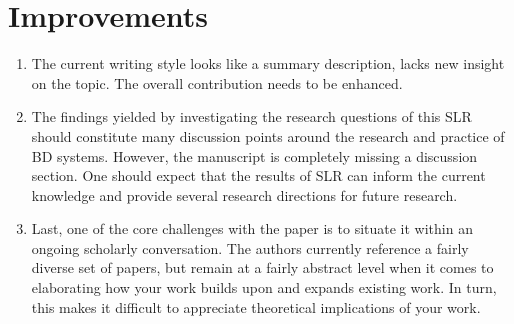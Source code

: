 \documentclass[review]{elsarticle}
\begin{document}
\section{Improvements}

\begin{enumerate}
    \item The current writing style looks like a summary description, lacks new insight on the topic. The overall contribution needs to be enhanced.
    \item The findings yielded by investigating the research questions of this SLR should constitute many discussion points around the research and practice of BD systems. However, the manuscript is completely missing a discussion section. One should expect that the results of SLR can inform the current knowledge and provide several research directions for future research. 
    \item Last, one of the core challenges with the paper is to situate it within an ongoing scholarly conversation. The authors currently reference a fairly diverse set of papers, but remain at a fairly abstract level when it comes to elaborating how your work builds upon and expands existing work. In turn, this makes it difficult to appreciate theoretical implications of your work. 
\end{enumerate}
 


\end{document}

